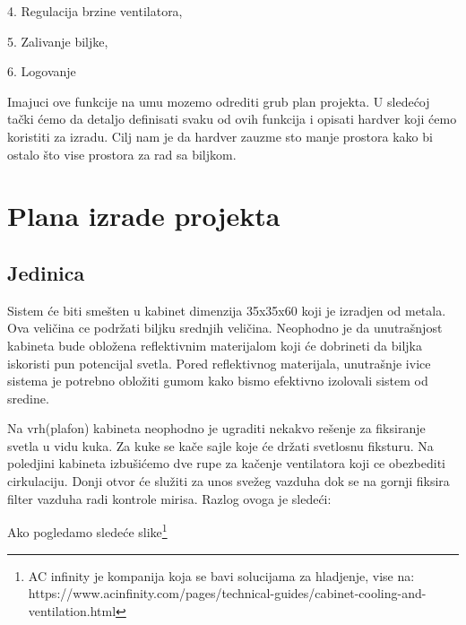 \documentclass[a4paper,11pt]{book}
\begin{document}
4. Regulacija brzine ventilatora,

5. Zalivanje biljke,

6. Logovanje 

\hrulefill

\noindent Imajuci ove funkcije na umu mozemo odrediti grub plan projekta. U sledećoj tački ćemo da detaljo definisati svaku od ovih funkcija i opisati hardver koji ćemo koristiti za izradu. Cilj nam je da hardver zauzme sto manje prostora kako bi ostalo što vise prostora za rad sa biljkom.

\section{Plana izrade projekta}

\subsection{Jedinica}

Sistem će biti smešten u kabinet dimenzija 35x35x60 koji je izradjen od metala. Ova veličina ce podržati biljku srednjih veličina. Neophodno je da unutrašnjost kabineta bude obložena reflektivnim materijalom koji će dobrineti da biljka iskoristi pun potencijal svetla. Pored reflektivnog materijala, unutrašnje ivice sistema je potrebno obložiti gumom kako bismo efektivno izolovali sistem od sredine.

Na vrh(plafon) kabineta neophodno je ugraditi nekakvo rešenje za fiksiranje svetla u vidu kuka. Za kuke se kače sajle koje će držati svetlosnu fiksturu. Na poledjini kabineta izbušićemo dve rupe za kačenje ventilatora koji ce obezbediti cirkulaciju. Donji otvor će služiti za unos svežeg vazduha dok se na gornji fiksira filter vazduha radi kontrole mirisa. Razlog ovoga je sledeći:

Ako pogledamo sledeće slike\footnote{AC infinity je kompanija koja se bavi solucijama za hladjenje, vise na: https://www.acinfinity.com/pages/technical-guides/cabinet-cooling-and-ventilation.html}
\end{document}
